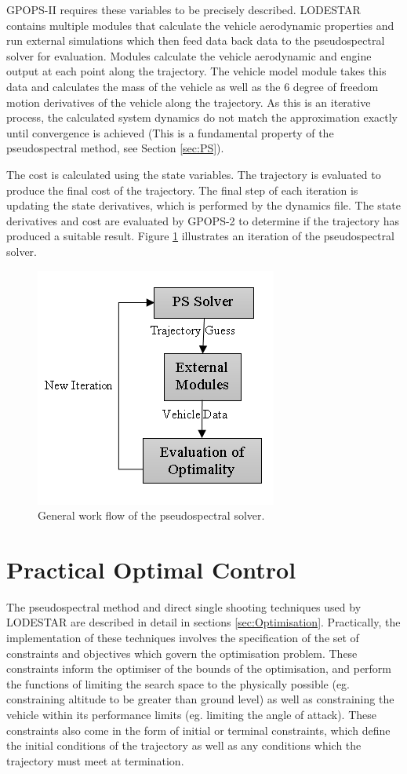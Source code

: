 GPOPS-II requires these variables to be precisely described. LODESTAR contains multiple modules that calculate the vehicle aerodynamic properties and run external simulations which then feed data back data to the pseudospectral solver for evaluation. Modules calculate the vehicle aerodynamic and engine output at each point along the trajectory. The vehicle model module takes this data and calculates the mass of the vehicle as well as the 6 degree of freedom motion derivatives of the vehicle along the trajectory. As this is an iterative process, the calculated system dynamics do not match the approximation exactly until convergence is achieved (This is a fundamental property of the pseudospectral method, see Section \ref{sec:PS}). 

The cost is calculated using the state variables. The trajectory is evaluated to produce the final cost of the trajectory. The final step of each iteration is updating the state derivatives, which is performed by the dynamics file. The state derivatives and cost are evaluated by GPOPS-2 to determine if the trajectory has produced a suitable result. Figure \ref{fig:FlowChartSmall} illustrates an iteration of the pseudospectral solver.

\begin{figure}
	\centering
	\includegraphics[width=0.5\linewidth]{figures/4_LODESTAR/FlowChartSmall}
	\caption{General work flow of the pseudospectral solver.}
	\label{fig:FlowChartSmall}
\end{figure}


\section{Practical Optimal Control}
The pseudospectral method and direct single shooting techniques used by LODESTAR are described in detail in sections \ref{sec:Optimisation}. Practically, the implementation of these techniques involves the specification of the set of constraints and objectives which govern the optimisation problem. These constraints inform the optimiser of the bounds of the optimisation, and perform the functions of limiting the search space to the physically possible (eg. constraining altitude to be greater than ground level) as well as constraining the vehicle within its performance limits (eg. limiting the angle of attack). These constraints also come in the form of initial or terminal constraints, which define the initial conditions of the trajectory as well as any conditions which the trajectory must meet at termination. 

